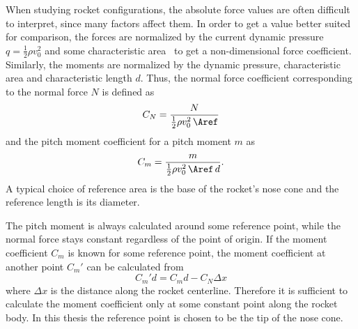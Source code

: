 When studying rocket configurations, the absolute force values are
often difficult to interpret, since many factors affect them.  In
order to get a value better suited for comparison, the forces are
normalized by the current dynamic pressure $q=\frac{1}{2}\rho v_0^2$
and some characteristic area \Aref\ to get a non-dimensional force
coefficient. Similarly, the moments are normalized by the dynamic
pressure, characteristic area and characteristic length $d$.  Thus,
the normal force coefficient corresponding to the normal force $N$ is
defined as
%
\begin{equation}
C_N  =  \frac{N}{\frac{1}{2}\rho v_0^2 \, \Aref} 
\label{eq-CN-def}
\end{equation}
%
and the pitch moment coefficient for a pitch moment $m$ as
%
\begin{equation}
C_m  =  \frac{m}{\frac{1}{2}\rho v_0^2 \, \Aref\, d}.
\label{eq-Cm-def}
\end{equation}
%
A typical choice of reference area is the base of the rocket's nose
cone and the reference length is its diameter.

The pitch moment is always calculated around some reference point,
while the normal force stays constant regardless of the point of
origin.  If the moment coefficient $C_m$ is known for some reference
point, the moment coefficient at another point $C_m'$ can be
calculated from
%
\begin{equation}
C_m'd = C_md - C_N\Delta x
\label{eq-moment-reference}
\end{equation}
%
where $\Delta x$ is the distance along the rocket centerline.
Therefore it is sufficient to calculate the moment coefficient only at
some constant point along the rocket body.  In this thesis the
reference point is chosen to be the tip of the nose cone.

